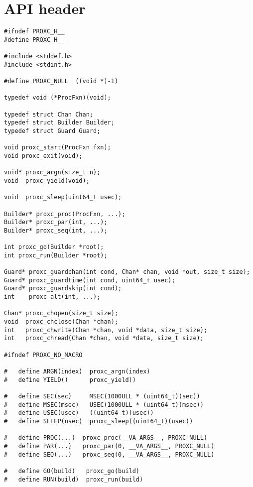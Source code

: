 
\chapter{API header}
\label{ch:api_header}

\begin{lstlisting}[style=CustomC,caption={API header file for ProXC},label={lst:api_header_file_proxc}]
#ifndef PROXC_H__
#define PROXC_H__

#include <stddef.h>
#include <stdint.h>

#define PROXC_NULL  ((void *)-1)

typedef void (*ProcFxn)(void);

typedef struct Chan Chan;
typedef struct Builder Builder;
typedef struct Guard Guard;

void proxc_start(ProcFxn fxn);
void proxc_exit(void);

void* proxc_argn(size_t n);
void  proxc_yield(void);

void  proxc_sleep(uint64_t usec);

Builder* proxc_proc(ProcFxn, ...);
Builder* proxc_par(int, ...);
Builder* proxc_seq(int, ...);

int proxc_go(Builder *root);
int proxc_run(Builder *root);

Guard* proxc_guardchan(int cond, Chan* chan, void *out, size_t size);
Guard* proxc_guardtime(int cond, uint64_t usec);
Guard* proxc_guardskip(int cond);
int    proxc_alt(int, ...);

Chan* proxc_chopen(size_t size);
void  proxc_chclose(Chan *chan);
int   proxc_chwrite(Chan *chan, void *data, size_t size);
int   proxc_chread(Chan *chan, void *data, size_t size);

#ifndef PROXC_NO_MACRO

#   define ARGN(index)  proxc_argn(index)
#   define YIELD()      proxc_yield()

#   define SEC(sec)     MSEC(1000ULL * (uint64_t)(sec))
#   define MSEC(msec)   USEC(1000ULL * (uint64_t)(msec))
#   define USEC(usec)   ((uint64_t)(usec))
#   define SLEEP(usec)  proxc_sleep((uint64_t)(usec))

#   define PROC(...)  proxc_proc(__VA_ARGS__, PROXC_NULL)
#   define PAR(...)   proxc_par(0, __VA_ARGS__, PROXC_NULL)
#   define SEQ(...)   proxc_seq(0, __VA_ARGS__, PROXC_NULL)

#   define GO(build)   proxc_go(build)
#   define RUN(build)  proxc_run(build)


\end{lstlisting}
